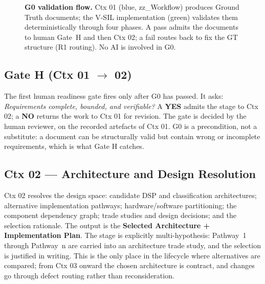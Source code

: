 \documentclass[11pt,a4paper]{article}
\begin{document}
\begin{figure}[htbp]
{}%
\caption{\textbf{G0 validation flow.} Ctx 01 (blue, zz\_Workflow) produces Ground Truth
documents; the V-SIL implementation (green) validates them deterministically through four
phases. A pass admits the documents to human Gate~H and then Ctx 02; a fail routes back to
fix the GT structure (R1 routing). No AI is involved in G0.}
\label{fig:g0flow}
\end{figure}

\subsection{Gate H (Ctx 01 $\rightarrow$ 02)}
\label{sec:gate-h1}

The first human readiness gate fires only after G0 has passed. It asks: \emph{Requirements
complete, bounded, and verifiable?} A \textbf{YES} admits the stage to Ctx 02; a \textbf{NO}
returns the work to Ctx 01 for revision. The gate is decided by the human reviewer, on the
recorded artefacts of Ctx 01. G0 is a precondition, not a substitute: a document can be
structurally valid but contain wrong or incomplete requirements, which is what Gate H catches.

\subsection{Ctx 02 --- Architecture and Design Resolution}
\label{sec:ctx02}

Ctx 02 resolves the design space: candidate DSP and classification architectures; alternative
implementation pathways; hardware/software partitioning; the component dependency graph; trade
studies and design decisions; and the selection rationale. The output is the \textbf{Selected
Architecture + Implementation Plan}. The stage is explicitly multi-hypothesis: Pathway~1 through
Pathway~n are carried into an architecture trade study, and the selection is justified in writing.
This is the only place in the lifecycle where alternatives are compared; from Ctx 03 onward the
chosen architecture is contract, and changes go through defect routing rather than reconsideration.
\end{document}
